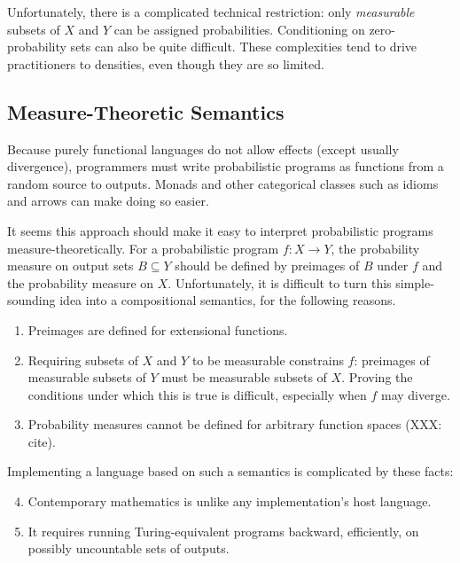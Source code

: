\documentclass[preprint]{sigplanconf}
\begin{document}
Unfortunately, there is a complicated technical restriction: only \emph{measurable} subsets of $X$ and $Y$ can be assigned probabilities.
Conditioning on zero-probability sets can also be quite difficult.
These complexities tend to drive practitioners to densities, even though they are so limited.

\subsection{Measure-Theoretic Semantics}

Because purely functional languages do not allow effects (except usually divergence), programmers must write probabilistic programs as functions from a random source to outputs.
Monads and other categorical classes such as idioms and arrows can make doing so easier.

It seems this approach should make it easy to interpret probabilistic programs measure-theoretically.
For a probabilistic program $f : X \to Y$, the probability measure on output sets $B \subseteq Y$ should be defined by preimages of $B$ under $f$ and the probability measure on $X$.
Unfortunately, it is difficult to turn this simple-sounding idea into a compositional semantics, for the following reasons.
\begin{enumerate}
	\item Preimages are defined for extensional functions. \label{problem:observable-domain}
	\item Requiring subsets of $X$ and $Y$ to be measurable constrains $f$: preimages of measurable subsets of $Y$ must be measurable subsets of $X$. Proving the conditions under which this is true is difficult, especially when $f$ may diverge. \label{problem:measurability}
	\item Probability measures cannot be defined for arbitrary function spaces (XXX: cite). \label{problem:higher-orderness}
\end{enumerate}
Implementing a language based on such a semantics is complicated by these facts:
\begin{enumerate}
	\setcounter{enumi}{3}
	\item Contemporary mathematics is unlike any implementation's host language. \label{problem:different-language}
	\item It requires running Turing-equivalent programs backward, efficiently, on possibly uncountable sets of outputs.\label{problem:backward-efficient}
\end{enumerate}
\end{document}
